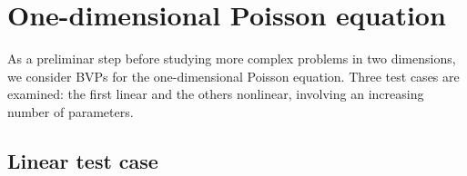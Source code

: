 \documentclass[12pt, a4paper, twoside, openright, notitlepage]{report}
\numberwithin{equation}{chapter}
\theoremstyle{theorem}
\theoremstyle{definition}
\theoremstyle{remark}
\theoremstyle{proposition}
\numberwithin{figure}{chapter}
\begin{document}
	\section{One-dimensional Poisson equation}
	\label{section:One-dimensional Poisson equation (results)}
	
		As a preliminar step before studying more complex problems in two dimensions, we consider BVPs for the one-dimensional Poisson equation. Three test cases are examined: the first linear and the others nonlinear, involving an increasing number of parameters. 
		
	
	\subsection{Linear test case}
	\label{section:poisson1d-1}
	
\end{document}
